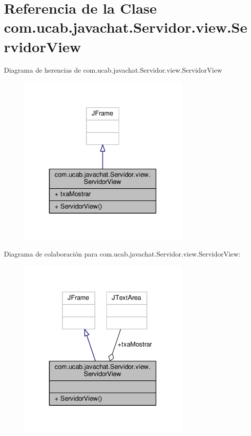 \hypertarget{classcom_1_1ucab_1_1javachat_1_1_servidor_1_1view_1_1_servidor_view}{\section{Referencia de la Clase com.\-ucab.\-javachat.\-Servidor.\-view.\-Servidor\-View}
\label{classcom_1_1ucab_1_1javachat_1_1_servidor_1_1view_1_1_servidor_view}
}


Diagrama de herencias de com.\-ucab.\-javachat.\-Servidor.\-view.\-Servidor\-View
\nopagebreak
\begin{figure}[H]
\begin{center}
\leavevmode
\includegraphics[width=244pt]{da/df4/classcom_1_1ucab_1_1javachat_1_1_servidor_1_1view_1_1_servidor_view__inherit__graph}
\end{center}
\end{figure}


Diagrama de colaboración para com.\-ucab.\-javachat.\-Servidor.\-view.\-Servidor\-View\-:
\nopagebreak
\begin{figure}[H]
\begin{center}
\leavevmode
\includegraphics[width=244pt]{d4/d3d/classcom_1_1ucab_1_1javachat_1_1_servidor_1_1view_1_1_servidor_view__coll__graph}
\end{center}
\end{figure}
